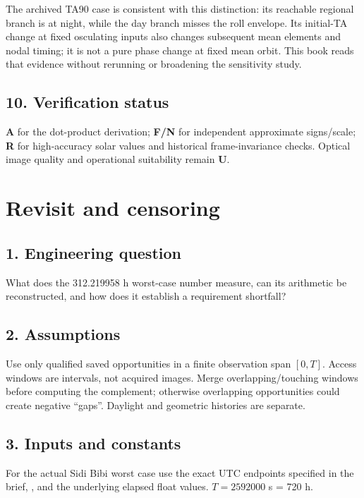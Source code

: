 \documentclass[10pt,a4paper]{article}
\numberwithin{equation}{section}
\begin{document}
\begin{sloppypar}The archived TA90 case is consistent with this distinction: its reachable regional branch is at night, while the day branch misses the roll envelope. Its initial-TA change at fixed osculating inputs also changes subsequent mean elements and nodal timing; it is not a pure phase change at fixed mean orbit. This book reads that evidence without rerunning or broadening the sensitivity study.\end{sloppypar}


\subsection*{10. Verification status}
\begin{sloppypar}\textbf{A} for the dot-product derivation; \textbf{F/N} for independent approximate signs/scale; \textbf{R} for high-accuracy solar values and historical frame-invariance checks. Optical image quality and operational suitability remain \textbf{U}.\end{sloppypar}




\clearpage\section{Revisit and censoring}\label{ch:9}

\subsection*{1. Engineering question}
\begin{sloppypar}What does the 312.219958 h worst-case number measure, can its arithmetic be reconstructed, and how does it establish a requirement shortfall?\end{sloppypar}


\subsection*{2. Assumptions}
\begin{sloppypar}Use only qualified saved opportunities in a finite observation span \([0,T]\). Access windows are intervals, not acquired images. Merge overlapping/touching windows before computing the complement; otherwise overlapping opportunities could create negative ``gaps''. Daylight and geometric histories are separate.\end{sloppypar}


\subsection*{3. Inputs and constants}
\begin{sloppypar}For the actual Sidi Bibi worst case use the exact UTC endpoints specified in the brief, \cite{S08}, and the underlying elapsed float values. \(T=2592000\) s = 720 h.\end{sloppypar}
\end{document}
